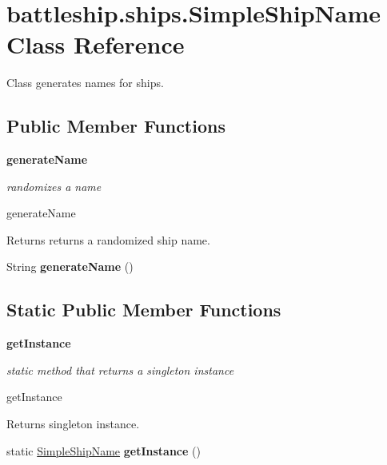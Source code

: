 \hypertarget{classbattleship_1_1ships_1_1SimpleShipName}{}\section{battleship.\+ships.\+Simple\+Ship\+Name Class Reference}
\label{classbattleship_1_1ships_1_1SimpleShipName}


Class generates names for ships.  


\subsection*{Public Member Functions}
\begin{Indent}{\bf generate\+Name}\par
{\em randomizes a name

generate\+Name

\begin{DoxyReturn}{Returns}
returns a randomized ship name. 
\end{DoxyReturn}
}\begin{DoxyCompactItemize}
\item 
\hypertarget{classbattleship_1_1ships_1_1SimpleShipName_a975802c70b51ade56cffba51036a429e}{}String {\bfseries generate\+Name} ()\label{classbattleship_1_1ships_1_1SimpleShipName_a975802c70b51ade56cffba51036a429e}

\end{DoxyCompactItemize}
\end{Indent}
\subsection*{Static Public Member Functions}
\begin{Indent}{\bf get\+Instance}\par
{\em static method that returns a singleton instance

get\+Instance

\begin{DoxyReturn}{Returns}
singleton instance. 
\end{DoxyReturn}
}\begin{DoxyCompactItemize}
\item 
\hypertarget{classbattleship_1_1ships_1_1SimpleShipName_a2e687468c422e84314d31b552bea4219}{}static \hyperlink{classbattleship_1_1ships_1_1SimpleShipName}{Simple\+Ship\+Name} {\bfseries get\+Instance} ()\label{classbattleship_1_1ships_1_1SimpleShipName_a2e687468c422e84314d31b552bea4219}

\end{DoxyCompactItemize}
\end{Indent}


